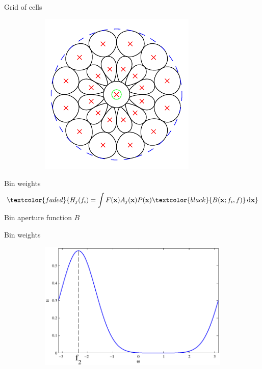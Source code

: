 \documentclass[14pt,t]{beamer}
\def\x{\mathbf{x}}
\begin{document}
\begin{frame}{Grid of cells}
\begin{figure}
\centering
	\begin{subfigure}[t]{0.7\textwidth}
		\includegraphics[width=\textwidth]{img/gridExample.pdf}
	\end{subfigure}
\end{figure}
\end{frame}
%
\begin{frame}{Bin weights}
\begin{align*}
\textcolor{faded}{H_j(f_i) = \int F(\x) A_j (\x) P (\x) \textcolor{black}{B(\x; f_i,f)} \,\text{d} \x}
\end{align*}
Bin aperture function $B$
\end{frame}
%
\begin{frame}{Bin weights}
\begin{figure}
\centering
	\begin{subfigure}[t]{1\textwidth}
		\includegraphics[width=\textwidth]{img/binExample.pdf}
	\end{subfigure}
\end{figure}
\end{frame}
\end{document}
